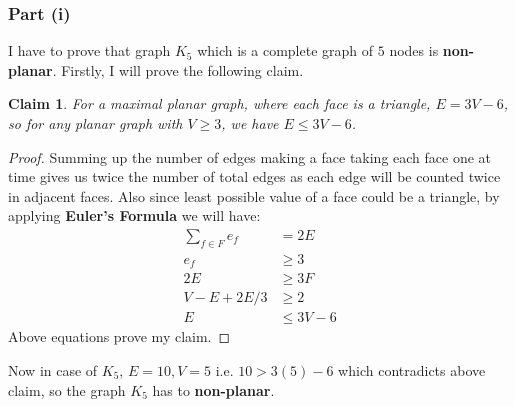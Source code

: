 \documentclass{article}
\let\bold\textbf
\newtheorem{claim}{Claim}[section]
\begin{document}
{{    \subsubsection{Part (i)}{
      I have to prove that graph $K_5$ which is a complete graph of $5$ nodes is \bold{non-planar}. \newline
      Firstly, I will prove the following claim.
      \begin{claim}
        For a maximal planar graph, where each face is a triangle, $E=3V-6$, so for any planar graph with $V \geq 3$, we have $E \leq 3V-6$.
      \end{claim}
      \begin{proof}
        Summing up the number of edges making a face taking each face one at time gives us twice the number of total edges as each edge will be counted twice in adjacent faces. \newline
        Also since least possible value of a face could be a triangle, by applying \bold{Euler's Formula} we will have:
        \begin{align*}
          \sum_{f \in F} e_f &= 2E \\
          e_f &\geq 3 \\
          2E &\geq 3F \\
          V-E+2E/3 &\geq 2 \\
          E &\leq 3V-6
        \end{align*}
        Above equations prove my claim.
      \end{proof}
      Now in case of $K_5$, $E=10,V=5$ i.e. $10 > 3(5)-6$ which contradicts above claim, so the graph $K_5$ has to \bold{non-planar}.
    }
}}
\end{document}
